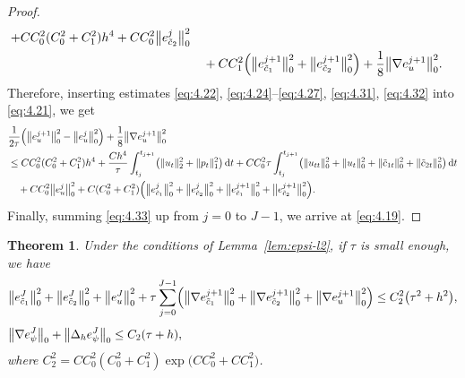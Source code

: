 \documentclass[a4paper,fleqn]{cas-sc}
\numberwithin{equation}{section}
\newtheorem{theorem}{Theorem}[section]
\theoremstyle{definition}
\begin{document}
\begin{proof}
\begin{align}
    + CC_{0}^{2}(C_{0}^{2}+C_{1}^{2})h^{4}
    + CC_{0}^{2}\bigl\|e_{\tilde{c}_{2}}^{j}\bigr\|_{0}^{2}
  \nonumber\\
  &\quad + CC_{1}^{2}\Bigl(\bigl\|e_{\tilde{c}_{1}}^{j+1}\bigr\|_{0}^{2}
                           + \bigl\|e_{\tilde{c}_{2}}^{j+1}\bigr\|_{0}^{2}\Bigr)
         + \frac{1}{8}\bigl\|\nabla e_{u}^{j+1}\bigr\|_{0}^{2}.
  \label{eq:4.32}
\end{align}
Therefore, inserting estimates \eqref{eq:4.22}, \eqref{eq:4.24}--\eqref{eq:4.27}, \eqref{eq:4.31},
\eqref{eq:4.32} into \eqref{eq:4.21}, we get
\begin{align}
  &\frac{1}{2\tau}\Bigl(\bigl\|e_{u}^{j+1}\bigr\|_{0}^{2}
                       - \bigl\|e_{u}^{j}\bigr\|_{0}^{2}\Bigr)
   + \frac{1}{8}\bigl\|\nabla e_{u}^{j+1}\bigr\|_{0}^{2}
  \nonumber\\
  &\leq CC_{0}^{2}(C_{0}^{2}+C_{1}^{2})h^{4}
   + \frac{Ch^{4}}{\tau}\int_{t_{j}}^{t_{j+1}}
     \bigl(\|u_{t}\|_{2}^{2} + \|p_{t}\|_{1}^{2}\bigr)\,\mathrm{d}t
   + CC_{0}^{2}\tau\int_{t_{j}}^{t_{j+1}}
     \bigl(\|u_{tt}\|_{0}^{2} + \|u_{t}\|_{0}^{2}
          + \|\tilde{c}_{1t}\|_{0}^{2} + \|\tilde{c}_{2t}\|_{0}^{2}\bigr)\,\mathrm{d}t
  \nonumber\\
  &\quad + CC_{0}^{2}\bigl\|e_{u}^{j}\bigr\|_{0}^{2}
   + C(C_{0}^{2}+C_{1}^{2})\Bigl(\bigl\|e_{\tilde{c}_{1}}^{j}\bigr\|_{0}^{2}
                                  + \bigl\|e_{\tilde{c}_{2}}^{j}\bigr\|_{0}^{2}
                                  + \bigl\|e_{\tilde{c}_{1}}^{j+1}\bigr\|_{0}^{2}
                                  + \bigl\|e_{\tilde{c}_{2}}^{j+1}\bigr\|_{0}^{2}\Bigr).
  \label{eq:4.33}
\end{align}
Finally, summing \eqref{eq:4.33} up from $j = 0$ to $J-1$, we arrive at \eqref{eq:4.19}.
\end{proof}

\begin{theorem}\label{thm:l2}
Under the conditions of Lemma~\ref{lem:epsi-l2}, if $\tau$ is small enough, we have
\begin{align}
  &\bigl\|e_{\tilde{c}_{1}}^{J}\bigr\|_{0}^{2}
   + \bigl\|e_{\tilde{c}_{2}}^{J}\bigr\|_{0}^{2}
   + \bigl\|e_{u}^{J}\bigr\|_{0}^{2}
   + \tau\sum_{j=0}^{J-1}\Bigl(\bigl\|\nabla e_{\tilde{c}_{1}}^{j+1}\bigr\|_{0}^{2}
                               + \bigl\|\nabla e_{\tilde{c}_{2}}^{j+1}\bigr\|_{0}^{2}
                               + \bigl\|\nabla e_{u}^{j+1}\bigr\|_{0}^{2}\Bigr)
   \leq C_{2}^{2}\bigl(\tau^{2} + h^{2}\bigr),
  \label{eq:4.34}\\[4pt]
  &\bigl\|\nabla e_{\psi}^{J}\bigr\|_{0}
   + \bigl\|\Delta_{h}e_{\psi}^{J}\bigr\|_{0}
   \leq C_{2}(\tau + h),
  \label{eq:4.35}
\end{align}
where $C_{2}^{2} = CC_{0}^{2}(C_{0}^{2}+C_{1}^{2})\exp\!\bigl(CC_{0}^{2}+CC_{1}^{2}\bigr)$.
\end{theorem}
\end{document}

